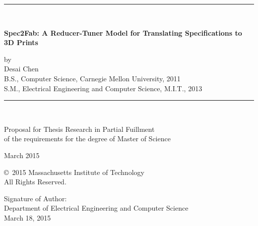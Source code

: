 

\thispagestyle{empty}

\begin{centering}
\rule{\textwidth}{.05in}\\ \vspace{.10in}

\Large \textbf{\textsf{ Spec2Fab: A Reducer-Tuner Model for Translating Specifications to 3D Prints
}} \\
\normalsize

\vspace{.1in}
by \\

\vspace{.1in}
Desai Chen\\

\vspace{.1in} B.S., Computer Science,
Carnegie Mellon University, 2011 \\

\vspace{.0in} S.M., Electrical Engineering and Computer Science,
M.I.T., 2013 \\

\vspace{.1in}
\rule{\textwidth}{.05in}\\

\vspace{.2in}

Proposal for Thesis Research in Partial Fuillment\\
of the requirements for the degree of Master of Science\\

\vspace{.15in}

\vspace{.1in} March 2015

\vspace{.15in} \copyright\ 2015
Massachusetts Institute of Technology \\
All Rights Reserved. \\

\end{centering}

\vspace{.3in}

\noindent
Signature of Author: \underline{\mbox{\hspace{4.28in}}} \\
\vspace{-.25in}
{\flushright Department of Electrical Engineering and Computer Science \\
March 18, 2015\\
}

